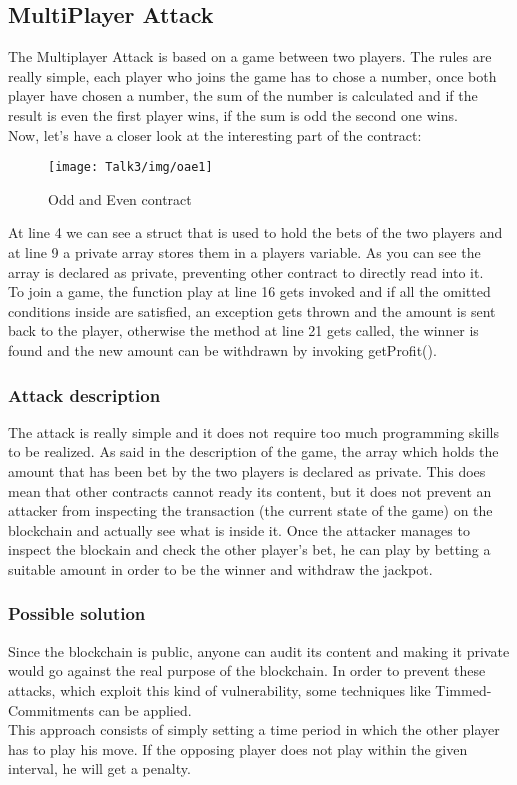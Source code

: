 \subsection{MultiPlayer Attack}
The Multiplayer Attack is based on a game between two players. The rules are really simple, each player who joins the game has to chose a number, once both player have chosen a number, the sum of the number is calculated and if the result is even the first player wins, if the sum is odd the second one wins.
\\Now, let's have a closer look at the interesting part of the contract:
\begin{figure}[H]
\begin{center}
\texttt{[image: Talk3/img/oae1]}
\end{center}
\caption{Odd and Even contract}
\label{label}
\end{figure}
At line 4 we can see a struct that is used to hold the bets of the two players and at line 9 a private array stores them in a players variable. As you can see the array is declared as private, preventing other contract to directly read into it.\\
To join a game,  the function play at line 16 gets invoked and if all the omitted conditions inside are satisfied, an exception gets thrown and the amount is sent back to the player, otherwise the method at line 21 gets called, the winner is found and the new amount can be withdrawn by invoking getProfit().
\subsubsection{Attack description}
The attack is really simple and it does not require too much programming skills to be realized. As said in the description of the game, the array which holds the amount that has been bet by the two players is declared as private. This does mean that other contracts cannot ready its content, but it does not prevent an attacker from inspecting the transaction (the current state of the game) on the blockchain and actually see what is inside it. Once the attacker manages to inspect the blockain and check the other player's bet, he can play by betting a suitable amount in order to be the winner and withdraw the jackpot.
\subsubsection{Possible solution}
Since the blockchain is public, anyone can audit its content and making it private would go against the real purpose of the blockchain. In order to prevent these attacks, which exploit this kind of vulnerability, some techniques like Timmed-Commitments \cite{timmedCommitments1, paper2} can be applied.\\
This approach consists of simply setting a time period in which the other player has to play his move. If the opposing player does not play within the given interval, he will get a penalty.
